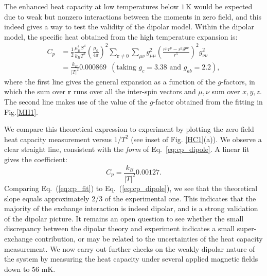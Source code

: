 \documentclass[aps,prl,reprint,showpacs,showkeys,superscriptaddress,floatfix,twocolumn]{revtex4-2}
\begin{document}
The enhanced heat capacity at low temperatures below $1$\,K would be expected due to weak but nonzero interactions between the moments in zero field, and this indeed gives a way to test the validity of the dipolar model. Within the dipolar model, the specific heat obtained from the high temperature expansion is:
\begin{equation}\label{eq:cp_dipole}
\begin{aligned}
    C_p &=  \frac{1}{2} \frac{\mu_B^4 S^4}{k_B T^2} \left(\frac{\mu_0}{4\pi}\right)^2  \sum_{\bm{r}\neq 0} \sum_{\mu\nu}g_{\mu\mu}^2 \left( \frac{r^\mu r^\nu - r^2 \delta^{\mu\nu}}{r^5}\right)^2 g_{\nu\nu}^2\\
    &=\frac{k_B}{|T|^2}0.000869 \,\,\,(\text{taking }g_c=3.38\text{ and }g_{ab}=2.2),
\end{aligned}
\end{equation}
where the first line gives the general expansion as a function of the $g$-factors, in which the sum over $\bm{r}$ runs over all the inter-spin vectors and $\mu,\nu$ sum over $x,y,z$. The second line makes use of the value of the $g$-factor obtained from the fitting in Fig.\ref{MH1}.

We compare this theoretical expression to experiment by plotting the zero field heat capacity measurement versus $1/T^2$ (see inset of Fig. \ref{HC1}(a)).  We observe a clear straight line, consistent with the {\em form} of Eq.~\eqref{eq:cp_dipole}.  A linear fit gives the coefficient:
\begin{equation}\label{eq:cp_fit}
    C_p = \frac{k_B}{|T|^2}0.00127.
\end{equation}
Comparing Eq.~(\ref{eq:cp_fit}) to Eq.~(\ref{eq:cp_dipole}), we see that the theoretical slope equals approximately 2/3 of the experimental one. This indicates that the majority of the exchange interaction is indeed dipolar, and is a strong validation of the dipolar picture.  It remains an open question to see whether the small discrepancy between the dipolar theory and experiment indicates a small super-exchange contribution, or may be related to the uncertainties of the heat capacity measurement. We now carry out further checks on the weakly dipolar nature of the system by measuring the heat capacity under several applied magnetic fields down to 56 mK.
\end{document}
